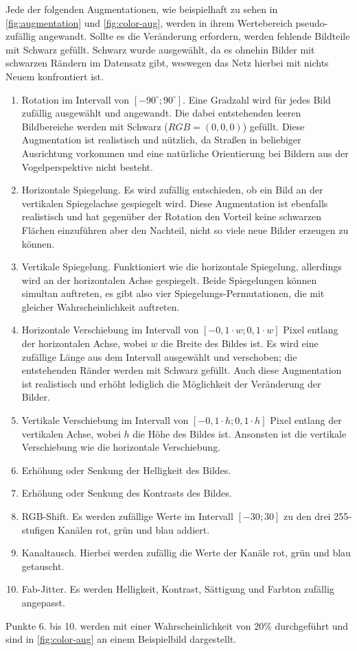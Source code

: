 Jede der folgenden Augmentationen, wie beispielhaft zu sehen in \autoref{fig:augmentation} und \autoref{fig:color-aug}, 
werden in ihrem Wertebereich pseudo-zufällig angewandt. 
Sollte es die Veränderung erfordern, werden fehlende Bildteile mit Schwarz gefüllt. Schwarz wurde ausgewählt, da es ohnehin Bilder mit 
schwarzen Rändern im Datensatz gibt, weswegen das Netz hierbei mit nichts Neuem konfrontiert ist. 
\begin{enumerate}
	\item Rotation im Intervall von $[-90^\circ ; 90^\circ ]$. Eine Gradzahl wird für jedes Bild zufällig ausgewählt und angewandt. 
	Die dabei entstehenden leeren Bildbereiche werden mit Schwarz ($RGB = (0,0,0)$) gefüllt. 
	Diese Augmentation ist realistisch und nützlich, da Straßen in beliebiger Ausrichtung vorkommen und 
	eine natürliche Orientierung bei Bildern aus der Vogelperspektive nicht besteht.
	\item Horizontale Spiegelung. Es wird zufällig entschieden, ob ein Bild an der vertikalen Spiegelachse gespiegelt wird. 
	Diese Augmentation ist ebenfalls realistisch und hat gegenüber der Rotation den Vorteil keine schwarzen Flächen 
	einzuführen aber den Nachteil, nicht so viele neue Bilder erzeugen zu können. 
	\item Vertikale Spiegelung. Funktioniert wie die horizontale Spiegelung, allerdings wird an der horizontalen Achse gespiegelt. 
	Beide Spiegelungen können simultan auftreten, es gibt also vier Spiegelungs-Permutationen, 
	die mit gleicher Wahrscheinlichkeit auftreten.
	\item Horizontale Verschiebung im Intervall von $[-0,1 \cdot w; 0,1 \cdot w]$ Pixel entlang der horizontalen Achse,
	wobei $w$ die Breite des Bildes ist. Es wird eine zufällige Länge aus dem Intervall ausgewählt und verschoben; die 
	entstehenden Ränder werden mit Schwarz gefüllt. Auch diese Augmentation ist realistisch und erhöht lediglich 
	die Möglichkeit der Veränderung der Bilder. 
	\item Vertikale Verschiebung im Intervall von $[-0,1 \cdot h; 0,1 \cdot h]$ Pixel entlang der vertikalen Achse,
	wobei $h$ die Höhe des Bildes ist. Ansonsten ist die vertikale Verschiebung wie die horizontale Verschiebung.  
	\item Erhöhung oder Senkung der Helligkeit des Bildes.
	\item Erhöhung oder Senkung des Kontrasts des Bildes.
	\item RGB-Shift. Es werden zufällige Werte im Intervall $[-30; 30]$ zu den drei 255-stufigen Kanälen rot, grün und blau addiert.   
	\item Kanaltausch. Hierbei werden zufällig die Werte der Kanäle rot, grün und blau getauscht. 
	\item Fab-Jitter. Es werden Helligkeit, Kontrast, Sättigung und Farbton zufällig angepasst. 
\end{enumerate} 
Punkte 6. bis 10. werden mit einer Wahrscheinlichkeit von 20\% durchgeführt und sind in \autoref{fig:color-aug} an einem Beispielbild dargestellt. 

